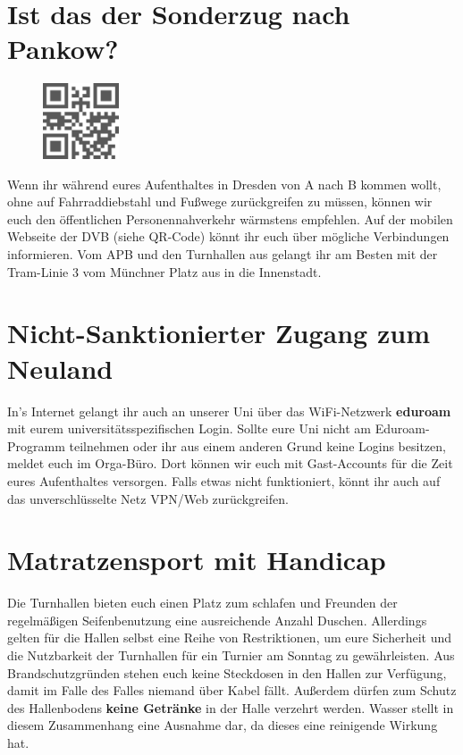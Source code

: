 \section*{Ist das der Sonderzug nach Pankow?}

\begin{figure}
  \vspace{-12pt}
  \begin{centering}
    \includegraphics[width=0.2\textwidth,keepaspectratio]{img/dvb_mobil.png}
  \end{centering}
  \vspace{-15pt}
\end{figure}

Wenn ihr während eures Aufenthaltes in Dresden von A nach B kommen wollt, ohne auf Fahrraddiebstahl und Fußwege zurückgreifen zu müssen, können wir euch den öffentlichen Personennahverkehr wärmstens empfehlen.
Auf der mobilen Webseite der DVB (siehe QR-Code) könnt ihr euch über mögliche Verbindungen informieren.
Vom APB und den Turnhallen aus gelangt ihr am Besten mit der Tram-Linie 3 vom Münchner Platz aus in die Innenstadt.

\section*{Nicht-Sanktionierter Zugang zum Neuland}

In's Internet gelangt ihr auch an unserer Uni über das WiFi-Netzwerk \textbf{eduroam} mit eurem universitätsspezifischen Login.
Sollte eure Uni nicht am Eduroam-Programm teilnehmen oder ihr aus einem anderen Grund keine Logins besitzen, meldet euch im Orga-Büro.
Dort können wir euch mit Gast-Accounts für die Zeit eures Aufenthaltes versorgen.
Falls etwas nicht funktioniert, könnt ihr auch auf das unverschlüsselte Netz VPN/Web zurückgreifen.

\section*{Matratzensport mit Handicap}

Die Turnhallen bieten euch einen Platz zum schlafen und Freunden der regelmäßigen Seifenbenutzung eine ausreichende Anzahl Duschen.
Allerdings gelten für die Hallen selbst eine Reihe von Restriktionen, um eure Sicherheit und die Nutzbarkeit der Turnhallen für ein Turnier am Sonntag zu gewährleisten.
Aus Brandschutzgründen stehen euch keine Steckdosen in den Hallen zur Verfügung, damit im Falle des Falles niemand über Kabel fällt.
Außerdem dürfen zum Schutz des Hallenbodens \textbf{keine Getränke} in der Halle verzehrt werden.
Wasser stellt in diesem Zusammenhang eine Ausnahme dar, da dieses eine reinigende Wirkung hat.

